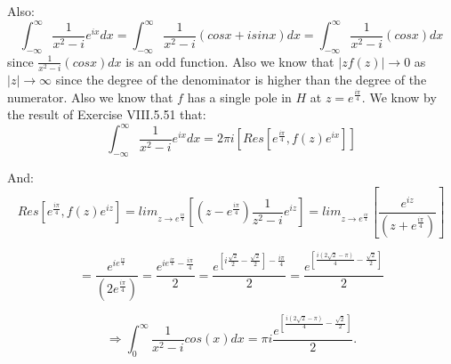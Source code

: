 \documentclass[10pt]{article}
\begin{document}
\begin{enumerate}
Also: 
\[\int_{-\infty}^\infty \frac{1}{x^2 - i}e^{ix}dx = \int_{-\infty}^\infty \frac{1}{x^2 - i}(cosx + isinx)dx = \int_{-\infty}^\infty \frac{1}{x^2 - i}(cosx)dx\]
since $\frac{1}{x^2 - i}(cosx)dx$ is an odd function. Also we know that $|zf(z)| \rightarrow 0$ as $|z| \to \infty$ since the degree of the denominator is higher than the degree of the numerator. Also we know that $f$ has a single pole in $H$ at $z = e^{\frac{i \pi}{4}}$. We know by the result of Exercise VIII.5.51 that: 
\[\int_{-\infty}^\infty \frac{1}{x^2 - i}e^{ix}dx = 2\pi i\left[Res[e^{\frac{i \pi}{4}},f(z)e^{ix}]\right]\]

And: 
\[Res[e^{\frac{i \pi}{4}},f(z)e^{iz}] = lim_{z \to e^{\frac{i \pi}{4}}}\left[(z-e^{\frac{i \pi}{4}})\frac{1}{z^2 - i}e^{iz}\right] = lim_{z \to e^{\frac{i \pi}{4}}}\left[\frac{e^{iz}}{(z+e^{\frac{i \pi}{4}})}\right]\]

\[= \frac{e^{ie^{\frac{i \pi}{4}}}}{(2e^{\frac{i \pi}{4}})} = \frac{e^{ie^{\frac{i \pi}{4}} - \frac{i\pi}{4}}}{2} = \frac{e^{[i\frac{\sqrt{2}}{2} -\frac{\sqrt{2}}{2}] - \frac{i\pi}{4}}}{2} = \frac{e^{[\frac{i(2\sqrt{2} - \pi)}{4} -\frac{\sqrt{2}}{2}]}}{2} \]

\[\Rightarrow \int_{0}^\infty \frac{1}{x^2 - i}cos(x)dx = \pi i\frac{e^{[\frac{i(2\sqrt{2} - \pi)}{4} -\frac{\sqrt{2}}{2}]}}{2} . \]
















\end{enumerate}
\end{document}
